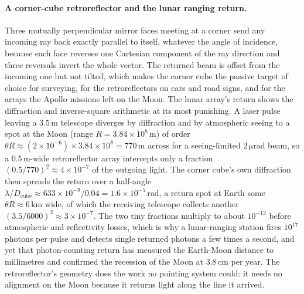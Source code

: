 \paragraph{A corner-cube retroreflector and the lunar ranging return.} Three
mutually perpendicular mirror faces meeting at a corner send any incoming ray back
exactly parallel to itself, whatever the angle of incidence, because each face
reverses one Cartesian component of the ray direction and three reversals invert
the whole vector. The returned beam is offset from the incoming one but not
tilted, which makes the corner cube the passive target of choice for surveying,
for the retroreflectors on cars and road signs, and for the arrays the Apollo
missions left on the Moon. The lunar array's return shows the diffraction and
inverse-square arithmetic at its most punishing. A laser pulse leaving a
$3.5\,\si{\meter}$ telescope diverges by diffraction and by atmospheric seeing to a
spot at the Moon (range $R = 3.84\times 10^{8}\,\si{\meter}$) of order
$\theta R \approx (2\times 10^{-6})\times 3.84\times 10^{8} = 770\,\si{\meter}$
across for a seeing-limited $2\,\si{\micro\radian}$ beam, so a
$0.5\,\si{\meter}$-wide retroreflector array intercepts only a fraction
$(0.5/770)^2 \approx 4\times 10^{-7}$ of the outgoing light. The corner cube's own
diffraction then spreads the return over a half-angle $\lambda/D_{\mathrm{cube}}
\approx 633\times 10^{-9}/0.04 = 1.6\times 10^{-5}\,\si{\radian}$, a return spot at
Earth some $\theta R \approx 6\,\si{\kilo\meter}$ wide, of which the receiving
telescope collects another $(3.5/6000)^2 \approx 3\times 10^{-7}$. The two tiny
fractions multiply to about $10^{-13}$ before atmospheric and reflectivity losses,
which is why a lunar-ranging station fires $10^{17}$ photons per pulse and detects
single returned photons a few times a second, and yet that photon-counting return
has measured the Earth-Moon distance to millimetres and confirmed the recession of
the Moon at $3.8\,\si{\centi\meter}$ per year. The retroreflector's geometry does
the work no pointing system could: it needs no alignment on the Moon because it
returns light along the line it arrived.

